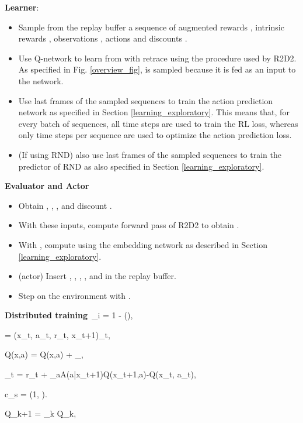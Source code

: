 \documentclass{article} \usepackage{iclr2020_conference,times}
\begin{document}
\textbf{Learner}:

\begin{itemize}
    \item Sample from the replay buffer a sequence of augmented rewards , intrinsic rewards , observations , actions  and discounts .
    \item Use Q-network to learn from  with retrace using the procedure used by R2D2. As specified in Fig. \ref{overview_fig},  is sampled because it is fed as an input to the network.
    \item Use last  frames of the sampled sequences to train the action prediction network as specified in Section \ref{learning_exploratory}. This means that, for every batch of sequences, all time steps are used to train the RL loss, whereas only  time steps per sequence are used to optimize the action prediction loss.
    \item (If using RND) also use last  frames of the sampled sequences to train the predictor of RND as also specified in Section \ref{learning_exploratory}.
\end{itemize}

\textbf{Evaluator and Actor}
\begin{itemize}
    \item Obtain , , , and discount .
    \item With these inputs, compute forward pass of R2D2 to obtain .
    \item With , compute  using the embedding network as described in Section \ref{learning_exploratory}.
    \item (actor) Insert , , , , and  in the replay buffer.
    \item Step on the environment with .
\end{itemize}

\textbf{Distributed training}\
\gamma_i = 1 - \exp\bigg(\bigg),

    \tau = \left(x_t, a_t, r_t, x_{t+1}\right)_{t\in{}},

Q(x,a) = Q(x,a) + _{\mu}\left[\sum_{t\geq0}\gamma^t\left(\prod_{s=1}^tc_s\right)\delta_t \right],

\delta_t = r_t + \gamma \sum_{a\in A}\pi(a|x_{t+1})Q(x_{t+1},a)-Q(x_t, a_t),    

c_s = \lambda\min\left(1, \right).    

    Q_{k+1} = _k Q_k,
\end{document}
